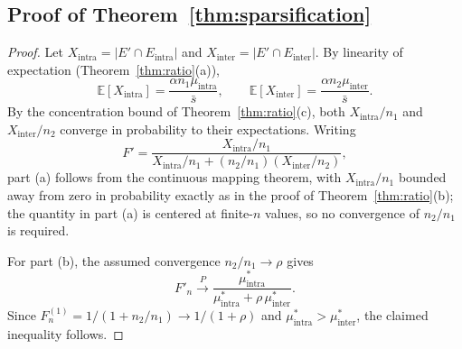 \documentclass[10pt,journal,compsoc]{IEEEtran}
\begin{document}
\subsection*{Proof of Theorem~\ref{thm:sparsification}}

\begin{proof}
Let $X_{\text{intra}} = |E' \cap E_{\text{intra}}|$ and $X_{\text{inter}} = |E' \cap E_{\text{inter}}|$.
By linearity of expectation (Theorem~\ref{thm:ratio}(a)),
\begin{equation}
\mathbb{E}[X_{\text{intra}}] = \frac{\alpha n_1 \mu_{\text{intra}}}{\bar{s}}, \qquad
\mathbb{E}[X_{\text{inter}}] = \frac{\alpha n_2 \mu_{\text{inter}}}{\bar{s}}.
\end{equation}
By the concentration bound of Theorem~\ref{thm:ratio}(c), both $X_{\text{intra}}/n_1$ and $X_{\text{inter}}/n_2$ converge in probability to their expectations.
Writing
\begin{equation}
F' = \frac{X_{\text{intra}}/n_1}{X_{\text{intra}}/n_1 + (n_2/n_1)(X_{\text{inter}}/n_2)},
\end{equation}
part (a) follows from the continuous mapping theorem, with $X_{\text{intra}}/n_1$ bounded away from zero in probability exactly as in the proof of Theorem~\ref{thm:ratio}(b); the quantity in part (a) is centered at finite-$n$ values, so no convergence of $n_2/n_1$ is required.

For part (b), the assumed convergence $n_2/n_1 \to \rho$ gives
\begin{equation}
F'_n \xrightarrow{P} \frac{\mu_{\text{intra}}^*}{\mu_{\text{intra}}^* + \rho\, \mu_{\text{inter}}^*}.
\end{equation}
Since $F^{(1)}_n = 1/(1 + n_2/n_1) \to 1/(1+\rho)$ and $\mu_{\text{intra}}^* > \mu_{\text{inter}}^*$, the claimed inequality follows.
\end{proof}
\end{document}

